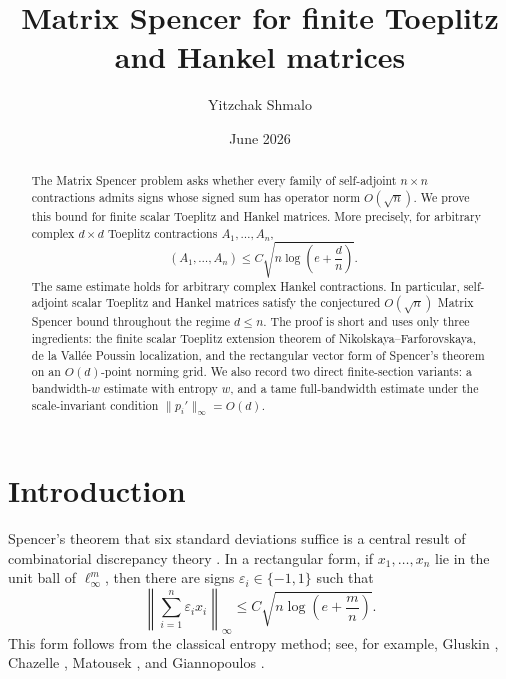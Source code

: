 \documentclass[11pt]{amsart}
\title[Matrix Spencer for Toeplitz and Hankel matrices]{Matrix Spencer for finite Toeplitz and Hankel matrices}
\author{Yitzchak Shmalo}
\date{June 2026}
\theoremstyle{definition}
\DeclareMathOperator{\discop}{disc_{op}}
\newcommand{\eps}{\varepsilon}
\begin{document}

\begin{abstract}
The Matrix Spencer problem asks whether every family of self-adjoint
$n\times n$ contractions admits signs whose signed sum has operator norm
$O(\sqrt n)$.  We prove this bound for finite scalar Toeplitz and Hankel
matrices.  More precisely, for arbitrary complex $d\times d$ Toeplitz
contractions $A_1,\ldots,A_n$,
\[
   \discop(A_1,\ldots,A_n)
   \le C\sqrt{n\log\!\left(e+\frac dn\right)} .
\]
The same estimate holds for arbitrary complex Hankel contractions.  In
particular, self-adjoint scalar Toeplitz and Hankel matrices satisfy the
conjectured $O(\sqrt n)$ Matrix Spencer bound throughout the regime $d\le n$.
The proof is short and uses only three ingredients: the finite scalar Toeplitz
extension theorem of Nikolskaya--Farforovskaya, de la Vall\'ee Poussin
localization, and the rectangular vector form of Spencer's theorem on an
$O(d)$-point norming grid.  We also record two direct finite-section variants:
a bandwidth-$w$ estimate with entropy $w$, and a tame full-bandwidth estimate
under the scale-invariant condition $\|p_i'\|_\infty=O(d)$.
\end{abstract}

\maketitle

\tableofcontents

\section{Introduction}

Spencer's theorem that six standard deviations suffice is a central result of
combinatorial discrepancy theory \cite{Spencer1985}.  In a rectangular form, if
$x_1,\ldots,x_n$ lie in the unit ball of $\ell_\infty^m$, then there are signs
$\eps_i\in\{-1,1\}$ such that
\[
   \left\|\sum_{i=1}^n \eps_i x_i\right\|_\infty
   \le C\sqrt{n\log\!\left(e+\frac mn\right)} .
\]
This form follows from the classical entropy method; see, for example,
Gluskin \cite{Gluskin1989}, Chazelle \cite{Chazelle2000}, Matousek
\cite{Matousek1999}, and Giannopoulos \cite{Giannopoulos1997}.
\end{document}
